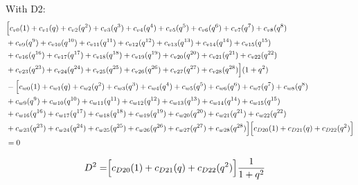 \documentclass[12pt]{article}
\begin{document}
With D2:
\begin{align}
    &\Bigl[  c_{v0}(1) + c_{v1}(q) + c_{v2}(q^2) + c_{v3}(q^3) + c_{v4}(q^4) + c_{v5}(q^5) + c_{v6}(q^6) + c_{v7}(q^7) + c_{v8}(q^8) \nonumber\\
    &+ c_{v9}(q^9) + c_{v10}(q^{10}) + c_{v11}(q^{11}) + c_{v12}(q^{12}) + c_{v13}(q^{13}) + c_{v14}(q^{14}) + c_{v15}(q^{15}) \nonumber\\
    &+ c_{v16}(q^{16})+ c_{v17}(q^{17}) + c_{v18}(q^{18}) + c_{v19}(q^{19}) + c_{v20}(q^{20}) + c_{v21}(q^{21}) + c_{v22}(q^{22}) \nonumber\\
    &+ c_{v23}(q^{23}) + c_{v24}(q^{24}) + c_{v25}(q^{25}) + c_{v26}(q^{26}) + c_{v27}(q^{27}) + c_{v28}(q^{28}) \Bigr] (1+q^2) \nonumber\\
    &- \Bigl[  c_{w0}(1) + c_{w1}(q) + c_{w2}(q^2) + c_{w3}(q^3) + c_{w4}(q^4) + c_{w5}(q^5) + c_{w6}(q^6) + c_{w7}(q^7) + c_{w8}(q^8) \nonumber\\
    &+ c_{w9}(q^9) + c_{w10}(q^{10}) + c_{w11}(q^{11}) + c_{w12}(q^{12}) + c_{w13}(q^{13}) + c_{w14}(q^{14}) + c_{w15}(q^{15}) \nonumber\\
    &+ c_{w16}(q^{16}) + c_{w17}(q^{17}) + c_{w18}(q^{18}) + c_{w19}(q^{19}) + c_{w20}(q^{20}) + c_{w21}(q^{21}) + c_{w22}(q^{22}) \nonumber\\
    &+ c_{w23}(q^{23}) + c_{w24}(q^{24}) + c_{w25}(q^{25}) + c_{w26}(q^{26}) + c_{w27}(q^{27}) + c_{w28}(q^{28}) \Bigr]\Bigl[ c_{D20}(1) + c_{D21}(q) + c_{D22}(q^2)\Bigr]  \nonumber\\
    &= 0
\end{align}

\begin{align}
    D^2 =& \Bigl[ c_{D20}(1) + c_{D21}(q) + c_{D22}(q^2)\Bigr]\frac{1}{1+q^2}
\end{align}
\end{document}
